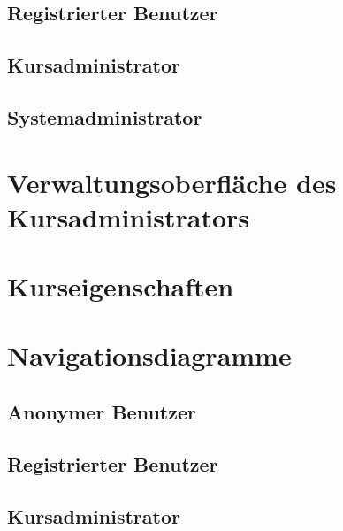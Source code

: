 \documentclass[a4paper]{scrreprt}
\begin{document}
       	
       	
    \subsection{Registrierter Benutzer}
       
       	
       	    
    \subsection{Kursadministrator}
        
        

    \subsection{Systemadministrator}
        
        
            
   
    
    \section{Verwaltungsoberfläche des Kursadministrators}
    
   
       
    
    \section{Kurseigenschaften}
    
    
       
    
    
    \section{Navigationsdiagramme}
        \subsection{Anonymer Benutzer}
            
            
            
        \subsection{Registrierter Benutzer}
             
            
            
        \subsection{Kursadministrator}
            
\end{document}
